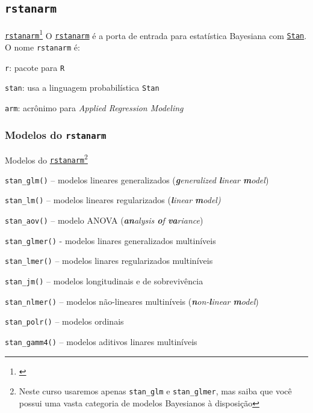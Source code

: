 \subsection{\texttt{rstanarm}}

\begin{frame}{\href{http://mc-stan.org/rstanarm/}{\texttt{rstanarm}}\footnote{\textcite{rstanarm}}}
    O \href{http://mc-stan.org/rstanarm/}{\texttt{rstanarm}} é a porta de
    entrada para estatística Bayesiana com \href{https://mc-stan.org}{\texttt{Stan}}.
    \vfill
    O nome \texttt{rstanarm} é:
    \begin{vfilleditems}
        \item \texttt{r}: pacote para \texttt{R}
        \item \texttt{stan}: usa a linguagem probabilística \texttt{Stan}
        \item \texttt{arm}: acrônimo para \textit{Applied Regression Modeling}
    \end{vfilleditems}
\end{frame}

\subsubsection{Modelos do \texttt{rstanarm}}
\begin{frame}{Modelos do \href{http://mc-stan.org/rstanarm/}{\texttt{rstanarm}}\footnote{Neste curso usaremos apenas \texttt{stan\_glm} e \texttt{stan\_glmer}, mas saiba que você possui uma vasta categoria de modelos Bayesianos à disposição}}
    \begin{vfilleditems}
        \item \texttt{stan\_glm()} -- modelos lineares generalizados (\textit{\textbf{g}eneralized \textbf{l}inear \textbf{m}odel})
        \item \texttt{stan\_lm()} -- modelos lineares regularizados (\textit{\textbf{l}inear \textbf{m}odel)}
        \item \texttt{stan\_aov()} -- modelo ANOVA (\textit{\textbf{an}alysis \textbf{o}f \textbf{va}riance})
        \item \texttt{stan\_glmer()} - modelos linares generalizados multiníveis
        \item \texttt{stan\_lmer()} -- modelos linares regularizados multiníveis
        \item \texttt{stan\_jm()} -- modelos longitudinais e de sobrevivência
        \item \texttt{stan\_nlmer()} -- modelos não-lineares multiníveis (\textit{\textbf{n}on-\textbf{l}inear \textbf{m}odel})
        \item \texttt{stan\_polr()} -- modelos ordinais
        \item \texttt{stan\_gamm4()} -- modelos aditivos linares multiníveis
    \end{vfilleditems}
\end{frame}

